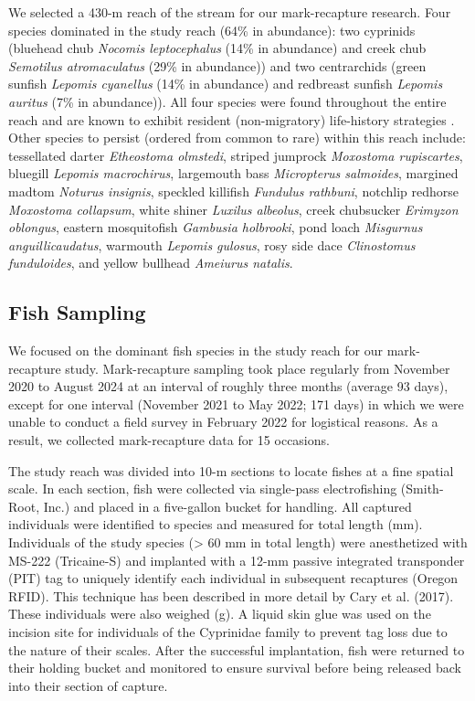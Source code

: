\documentclass[11pt, class=article, crop=false]{standalone}
\begin{document}
We selected a 430-m reach of the stream for our mark-recapture research. Four species dominated in the study reach (64\% in abundance): two cyprinids (bluehead chub \textit{Nocomis leptocephalus} (14\% in abundance) and creek chub \textit{Semotilus atromaculatus} (29\% in abundance)) and two centrarchids (green sunfish \textit{Lepomis cyanellus} (14\% in abundance) and redbreast sunfish \textit{Lepomis auritus} (7\% in abundance)). All four species were found throughout the entire reach and are known to exhibit resident (non-migratory) life-history strategies \citep{teruiNonrandomDispersalSympatric2021}. Other species to persist (ordered from common to rare) within this reach include: tessellated darter \textit{Etheostoma olmstedi}, striped jumprock \textit{Moxostoma rupiscartes}, bluegill \textit{Lepomis macrochirus}, largemouth bass \textit{Micropterus salmoides}, margined madtom \textit{Noturus insignis}, speckled killifish \textit{Fundulus rathbuni}, notchlip redhorse \textit{Moxostoma collapsum}, white shiner \textit{Luxilus albeolus}, creek chubsucker \textit{Erimyzon oblongus}, eastern mosquitofish \textit{Gambusia holbrooki}, pond loach \textit{Misgurnus anguillicaudatus}, warmouth \textit{Lepomis gulosus}, rosy side dace \textit{Clinostomus funduloides}, and yellow bullhead \textit{Ameiurus natalis}. 

\subsection{Fish Sampling}

We focused on the dominant fish species in the study reach for our mark-recapture study. Mark-recapture sampling took place regularly from November 2020 to August 2024 at an interval of roughly three months (average 93 days), except for one interval (November 2021 to May 2022; 171 days) in which we were unable to conduct a field survey in February 2022 for logistical reasons. As a result, we collected mark-recapture data for 15 occasions.

The study reach was divided into 10-m sections to locate fishes at a fine spatial scale. In each section, fish were collected via single-pass electrofishing (Smith-Root, Inc.) and placed in a five-gallon bucket for handling. All captured individuals were identified to species and measured for total length (mm). Individuals of the study species (> 60 mm in total length) were anesthetized with MS-222 (Tricaine-S) and implanted with a 12-mm passive integrated transponder (PIT) tag to uniquely identify each individual in subsequent recaptures (Oregon RFID). This technique has been described in more detail by Cary et al. (2017). These individuals were also weighed (g). A liquid skin glue was used on the incision site for individuals of the Cyprinidae family to prevent tag loss due to the nature of their scales. After the successful implantation, fish were returned to their holding bucket and monitored to ensure survival before being released back into their section of capture. 
\end{document}
